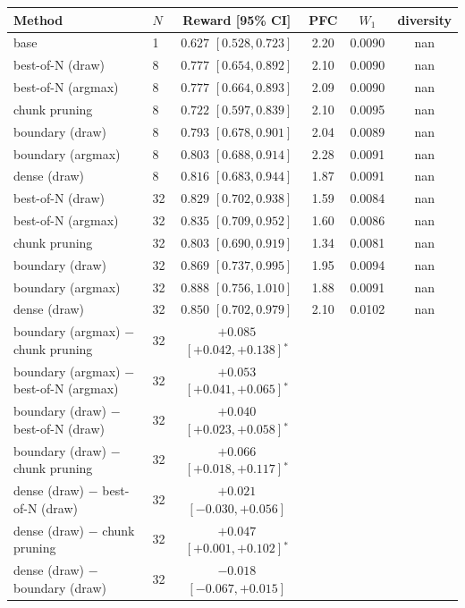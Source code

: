 \begin{tabular}{llcccc}
\toprule
Method & $N$ & Reward [95\% CI] & PFC & $W_1$ & diversity \\
\midrule
base & 1 & $0.627$ $[0.528, 0.723]$ & 2.20 & 0.0090 & nan \\
best-of-N (draw) & 8 & $0.777$ $[0.654, 0.892]$ & 2.10 & 0.0090 & nan \\
best-of-N (argmax) & 8 & $0.777$ $[0.664, 0.893]$ & 2.09 & 0.0090 & nan \\
chunk pruning & 8 & $0.722$ $[0.597, 0.839]$ & 2.10 & 0.0095 & nan \\
boundary (draw) & 8 & $0.793$ $[0.678, 0.901]$ & 2.04 & 0.0089 & nan \\
boundary (argmax) & 8 & $0.803$ $[0.688, 0.914]$ & 2.28 & 0.0091 & nan \\
dense (draw) & 8 & $0.816$ $[0.683, 0.944]$ & 1.87 & 0.0091 & nan \\
best-of-N (draw) & 32 & $0.829$ $[0.702, 0.938]$ & 1.59 & 0.0084 & nan \\
best-of-N (argmax) & 32 & $0.835$ $[0.709, 0.952]$ & 1.60 & 0.0086 & nan \\
chunk pruning & 32 & $0.803$ $[0.690, 0.919]$ & 1.34 & 0.0081 & nan \\
boundary (draw) & 32 & $0.869$ $[0.737, 0.995]$ & 1.95 & 0.0094 & nan \\
boundary (argmax) & 32 & $0.888$ $[0.756, 1.010]$ & 1.88 & 0.0091 & nan \\
dense (draw) & 32 & $0.850$ $[0.702, 0.979]$ & 2.10 & 0.0102 & nan \\
\midrule
boundary (argmax) $-$ chunk pruning & 32 & $+0.085$ $[+0.042, +0.138]$$^*$ & & & \\
boundary (argmax) $-$ best-of-N (argmax) & 32 & $+0.053$ $[+0.041, +0.065]$$^*$ & & & \\
boundary (draw) $-$ best-of-N (draw) & 32 & $+0.040$ $[+0.023, +0.058]$$^*$ & & & \\
boundary (draw) $-$ chunk pruning & 32 & $+0.066$ $[+0.018, +0.117]$$^*$ & & & \\
dense (draw) $-$ best-of-N (draw) & 32 & $+0.021$ $[-0.030, +0.056]$ & & & \\
dense (draw) $-$ chunk pruning & 32 & $+0.047$ $[+0.001, +0.102]$$^*$ & & & \\
dense (draw) $-$ boundary (draw) & 32 & $-0.018$ $[-0.067, +0.015]$ & & & \\
\bottomrule
\end{tabular}

